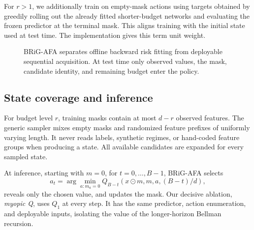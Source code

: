 \documentclass[10pt]{article}
\newcommand{\method}{BRiG-AFA}
\begin{document}
For $r>1$, we additionally train on empty-mask actions using targets obtained by greedily rolling out the already fitted shorter-budget networks and evaluating the frozen predictor at the terminal mask. This aligns training with the initial state used at test time. The implementation gives this term unit weight.

\begin{figure}[t]
\centering
{}
\caption{\method{} separates offline backward risk fitting from deployable sequential acquisition. At test time only observed values, the mask, candidate identity, and remaining budget enter the policy.}
\label{fig:method}
\end{figure}

\subsection{State coverage and inference}
For budget level $r$, training masks contain at most $d-r$ observed features. The generic sampler mixes empty masks and randomized feature prefixes of uniformly varying length. It never reads labels, synthetic regimes, or hand-coded feature groups when producing a state. All available candidates are expanded for every sampled state.

At inference, starting with $m=0$, for $t=0,\ldots,B-1$, \method{} selects
\begin{equation}
 a_t=\arg\min_{a:m_a=0}Q_{B-t}(x\odot m,m,a,(B-t)/d),
\end{equation}
reveals only the chosen value, and updates the mask. Our decisive ablation, \emph{myopic Q}, uses $Q_1$ at every step. It has the same predictor, action enumeration, and deployable inputs, isolating the value of the longer-horizon Bellman recursion.
\end{document}
